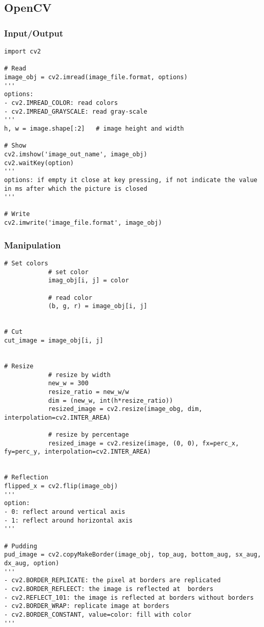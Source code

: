 \subsection{OpenCV}

\subsubsection{Input/Output}

\begin{verbatim}
import cv2

# Read
image_obj = cv2.imread(image_file.format, options)
'''
options:
- cv2.IMREAD_COLOR: read colors
- cv2.IMREAD_GRAYSCALE: read gray-scale
'''
h, w = image.shape[:2]   # image height and width

# Show
cv2.imshow('image_out_name', image_obj)
cv2.waitKey(option)
'''
options: if empty it close at key pressing, if not indicate the value in ms after which the picture is closed
'''

# Write
cv2.imwrite('image_file.format', image_obj)

\end{verbatim}




\subsubsection{Manipulation}

\begin{verbatim}
# Set colors
            # set color
            imag_obj[i, j] = color
            
            # read color
            (b, g, r) = image_obj[i, j]


# Cut
cut_image = image_obj[i, j]


# Resize
            # resize by width
            new_w = 300
            resize_ratio = new_w/w
            dim = (new_w, int(h*resize_ratio))
            resized_image = cv2.resize(image_obg, dim, interpolation=cv2.INTER_AREA)
            
            # resize by percentage
            resized_image = cv2.resize(image, (0, 0), fx=perc_x, fy=perc_y, interpolation=cv2.INTER_AREA)


# Reflection
flipped_x = cv2.flip(image_obj)
'''
option:
- 0: reflect around vertical axis
- 1: reflect around horizontal axis 
'''

# Pudding
pud_image = cv2.copyMakeBorder(image_obj, top_aug, bottom_aug, sx_aug, dx_aug, option)
'''
- cv2.BORDER_REPLICATE: the pixel at borders are replicated
- cv2.BORDER_REFLEECT: the image is reflected at  borders
- cv2.REFLECT_101: the image is reflected at borders without borders
- cv2.BORDER_WRAP: replicate image at borders
- cv2.BORDER_CONSTANT, value=color: fill with color
'''

\end{verbatim}




